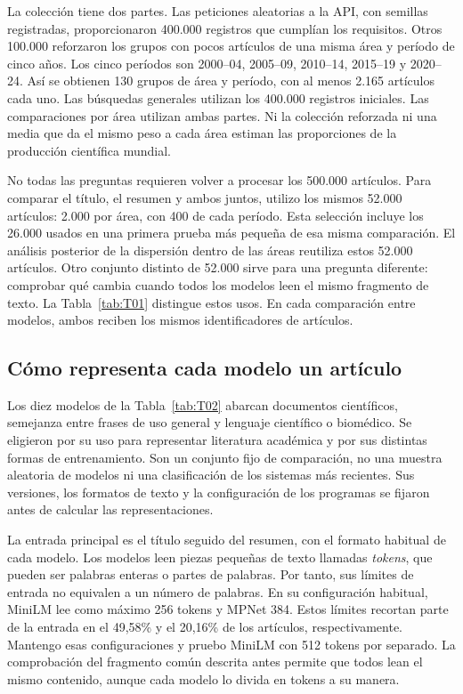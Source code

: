 \documentclass[12pt]{article}
\begin{document}
La colección tiene dos partes. Las peticiones aleatorias a la API, con semillas registradas, proporcionaron 400.000 registros que cumplían los requisitos. Otros 100.000 reforzaron los grupos con pocos artículos de una misma área y período de cinco años. Los cinco períodos son 2000--04, 2005--09, 2010--14, 2015--19 y 2020--24. Así se obtienen 130 grupos de área y período, con al menos 2.165 artículos cada uno. Las búsquedas generales utilizan los 400.000 registros iniciales. Las comparaciones por área utilizan ambas partes. Ni la colección reforzada ni una media que da el mismo peso a cada área estiman las proporciones de la producción científica mundial.

No todas las preguntas requieren volver a procesar los 500.000 artículos. Para comparar el título, el resumen y ambos juntos, utilizo los mismos 52.000 artículos: 2.000 por área, con 400 de cada período. Esta selección incluye los 26.000 usados en una primera prueba más pequeña de esa misma comparación. El análisis posterior de la dispersión dentro de las áreas reutiliza estos 52.000 artículos. Otro conjunto distinto de 52.000 sirve para una pregunta diferente: comprobar qué cambia cuando todos los modelos leen el mismo fragmento de texto. La Tabla~\ref{tab:T01} distingue estos usos. En cada comparación entre modelos, ambos reciben los mismos identificadores de artículos.


\subsection{Cómo representa cada modelo un artículo}
Los diez modelos de la Tabla~\ref{tab:T02} abarcan documentos científicos, semejanza entre frases de uso general y lenguaje científico o biomédico. Se eligieron por su uso para representar literatura académica y por sus distintas formas de entrenamiento. Son un conjunto fijo de comparación, no una muestra aleatoria de modelos ni una clasificación de los sistemas más recientes. Sus versiones, los formatos de texto y la configuración de los programas se fijaron antes de calcular las representaciones.

La entrada principal es el título seguido del resumen, con el formato habitual de cada modelo. Los modelos leen piezas pequeñas de texto llamadas \emph{tokens}, que pueden ser palabras enteras o partes de palabras. Por tanto, sus límites de entrada no equivalen a un número de palabras. En su configuración habitual, MiniLM lee como máximo 256 tokens y MPNet 384. Estos límites recortan parte de la entrada en el 49,58\% y el 20,16\% de los artículos, respectivamente. Mantengo esas configuraciones y pruebo MiniLM con 512 tokens por separado. La comprobación del fragmento común descrita antes permite que todos lean el mismo contenido, aunque cada modelo lo divida en tokens a su manera.
\end{document}
